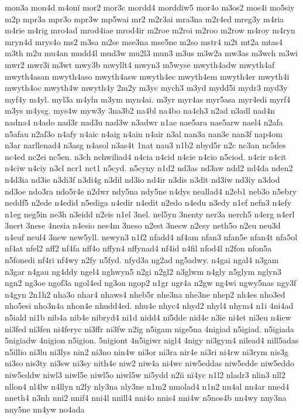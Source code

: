 {mon3a
mon4d
m4on^^ef
mor2
mor3c
mordd4
morddiw5
mor4o
m3os2
mos4i
mo5siy
m2p
mpr3a
mpr3o
mpr3w
mp5wai
mr2
m2r3ai
mra3na
m2r4ed
mreg3y
m4ria
m4rie
m4rig
mro4ad
mrod4iae
mrod4ir
m2roe
m2roi
m2roo
m2row
m4roy
m4ryn
mryn4d
mrys4o
ms2
m3sa
m2se
mse3na
mse5ne
m2so
mstr4
m2t
mt2a
mtas4
m3th
m2u
mu4an
mudd4l
mud3w
mu2l3
mun3
m3us
m3w2a
mw3as
m3wch
m3wi
mwr2
mwr3i
m3wt
mwy3b
mwyllt4
mwyn3
m5wyse
mwyth4adw
mwyth4af
mwyth4asan
mwyth4aso
mwyth4asw
mwyth4ec
mwyth4em
mwyth4er
mwyth4i
mwyth4oc
mwyth4w
mwyth4y
2m2y
m3yc
mych3
m3yd
mydd5i
mydr3
myd3y
myf4y
m4yl.
myl3a
m4yln
m3ym
myn4ai.
m3yr
myr4as
myr5asa
myr4edi
myrf4
m3ys
m4ysg.
mys4w
myw3y
3na3b2
na4bl
na4bo
na4ch3
n2ad
n3adl
nad4n
nadna4
n4ado
nad3r
nad3u
nad3w
n3adwr
n1ae
nae5ara
nae5arw
nael4
n2afa
n5afau
n2af3o
n4afy
n4aic
n4aig
n4ain
n4air
n3al
nan3a
nan3e
nan3f
nap4om
n3ar
narllenad4
n3asg
n4asol
n3as4t
1nat
nau3
n1b2
nbyd5r
n2c
nc3an
nc5des
nc4ed
nc2ei
nc5en.
n3ch
nchwiliad4
n4cia
n4cid
n4cie
n4cio
n5ciod.
n4cir
n4cit
n4ciw
n4ciy
n3cl
ncr1
nct1
n5cyd.
n5cyny
n1d2
nd3as
nd3aw
ndd2
nd4da
nden2
n4d3ia
nd3ie
n3di3f
n3di4g
n3dil
nd3io
nd4ir
n3dis
n3dit
nd3iw
nd3iy
n3dod
nd3oe
ndo3ra
ndo5r4e
n2dwr
ndy5na
ndy5ne
n4dys
neallad4
n2eb1
neb3o
n5ebry
neddf5
n2ede
n4edid
n5ediga
n4edir
n4edit
n2edo
n4edu
n3edy
n1ef
nefn3
n4efy
n1eg
neg5in
ne3h
n3eidd
n2eis
n1el
3nel.
nel5yn
3nenty
ner3a
nerch5
n4erg
n4erl
3nert
3nese
4nesia
n4esio
nes4m
3neso
n2est
3nesw
n2esy
neth5o
n2eu
neu3d
n4euf
neul4
3new
new5yll.
newyn3
n1f2
nfadd4
nf4am
nfan3
nfan5e
nfan4t
nfa5ol
nf4at
nfel2
nff2
nf4fa
nff4o
nffyn4
nffynad4
nf4id
n4fil
nfod4l
n2fon
nfon5a
n5fonedi
nf4ri
nf4wy
n2fy
n5fyd.
nfyd3a
ng2ad
ng5adwy.
n4gai
ngal4
n3gam
n3gar
n4gau
ng4ddy
ngel4
nghwyn5
n2gi
n2gl2
n3glwm
n4gly
n5glym
nglyn3
ngn2
ng3oe
ngof3a
ngol4ed
ng3on
ngop2
n1gr
ngr4a
n2gw
ng4wi
ngwy5nas
ngy3f
n4gyn
2n1h2
nha3o
nhar4
nhaws4
nheb5r
nhe3na
nhe3ne
nhep2
nh4es
nho3ed
nho5esi
nho3n4a
nhon4e
nhudd4ed.
nhu4e
nhyc4
nhyd2
nhyl4
nhym4
n1i
4ni4ad
n5iald
ni1b
nib4a
nib4e
nibryd4
ni1d
nidd4
ni5dde
nid4e
n3ie
ni4et
ni3eu
n4iew
ni3fed
ni3fen
ni4feryc
ni3ffr
ni3fw
n2ig
n5igam
nige5na
4nigiad
n5igiad.
n5igiada
5nigiadw
4nigion
n5igion.
5nigiont
4n5igiwr
nigl4
4nigy
ni3gym4
nilead4
nill5adas
n5illio
ni3lu
ni3lys
nin2
ni3no
nin4w
ni3or
ni3ra
nir4e
ni3ri
ni4rw
ni3rym
nis3g
ni3so
nis3ty
ni3sw
ni3sy
nith4e
niw2
niw4a
ni4wc
niw5eddas
niw5edde
niw5eddo
niw5eddw
niwl3
niwl5e
niwl5o
niwl5w
ni5ydd
n2^^efi
n^^ef4yc
n1l2
nladr3
nlin3
nll2
nllon4
nl4lw
n4llyn
n2ly
nly3na
nly3ne
n1m2
nmolad4
n1n2
nn4al
nn4ar
nned4
nneth4
n3nh
nni2
nnif4
nni4l
nnill4
nni4o
nnis4
nni4w
n5nos4b
nn4wy
nny3na
nny5ne
nn4yw
no4ada
}
